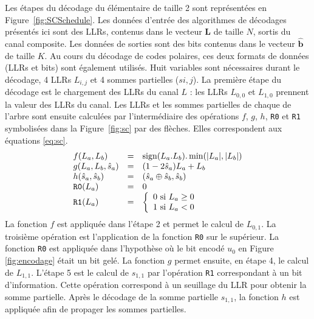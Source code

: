 %
Les étapes du décodage du \noeud élémentaire de taille 2 sont représentées en Figure~\ref{fig:SCSchedule}.
Les données d'entrée des algorithmes de décodages présentés ici sont des LLRs, contenus dans le vecteur $\mathbold{L}$ de taille $N$, sortis du canal composite.
Les données de sorties sont des bits contenus dans le vecteur $\mathbold{\hat{b}}$ de taille $K$.
Au cours du décodage de codes polaires, ces deux formats de données (LLRs et bits) sont également utilisés.
Huit variables sont nécessaires durant le décodage, 4 LLRs $L_{i,j}$ et 4 sommes partielles ($s{i,j}$).
La première étape du décodage est le chargement des LLRs du canal $L$ : les LLRs $L_{0,0}$ et $L_{1,0}$ prennent la valeur des LLRs du canal. Les LLRs et les sommes partielles de chaque \noeud de l'arbre sont ensuite calculées par l'intermédiaire des opérations $f$, $g$, $h$, \texttt{R0} et \texttt{R1} symbolisées dans la Figure~\ref{fig:sc} par des flèches. Elles correspondent aux équations \ref{eq:sc}. 
\begin{eqnarray}
  \begin{array}{l c l}
    f(L_a,L_b) &=& \text{sign}(L_a.L_b).\min(|L_a|,|L_b|)\\
    g(L_a,L_b,\hat{s}_a)&=&(1-2\hat{s}_a)L_a+L_b\\
    h(\hat{s}_a,\hat{s}_b)&=& (\hat{s}_{a} \oplus \hat{s}_{b}, \hat{s}_{b})\\
    \texttt{R0}(L_a) &=& 0 \\
    \texttt{R1}(L_a) &=&  \left\{\begin{array}{l c l} 0 \text{ si } L_a \geq 0 \\ 1 \text{ si } L_a < 0 \end{array}\right.
  \end{array}
  \label{eq:sc}
\end{eqnarray}
La fonction $f$ est appliquée dans l'étape 2 et permet le calcul de $L_{0,1}$.
La troisième opération est l'application de la fonction \texttt{R0} sur le \noeud supérieur. 
La fonction \texttt{R0} est appliquée dans l'hypothèse où le bit encodé $u_0$ en Figure \ref{fig:encodage} était un bit gelé.
La fonction $g$ permet ensuite, en étape 4, le calcul de $L_{1,1}$.
L'étape 5 est le calcul de $s_{1,1}$ par l'opération \texttt{R1} correspondant à un bit d'information. 
Cette opération correspond à un seuillage du LLR pour obtenir la somme partielle.
Après le décodage de la somme partielle $s_{1,1}$, la fonction $h$ est appliquée afin de propager les sommes partielles.


